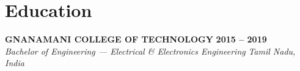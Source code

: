 \documentclass[letterpaper,10pt]{article}
\newcommand{\resumeSubheading}[4]{%
  \vspace{1pt}%
  \textbf{#1} \hfill \textbf{#2}\\
  \textit{#3} \hfill \textit{#4}\\[-3pt]
}
\begin{document}

\section{Education}

\resumeSubheading
  {GNANAMANI COLLEGE OF TECHNOLOGY}{2015 -- 2019}
  {Bachelor of Engineering --- Electrical \& Electronics Engineering}{Tamil Nadu, India}
\end{document}
